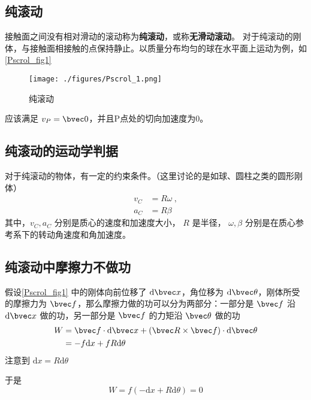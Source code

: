 

\subsection{纯滚动}
接触面之间没有相对滑动的滚动称为\textbf{纯滚动}，或称\textbf{无滑动滚动}。
对于纯滚动的刚体，与接触面相接触的点保持静止。以质量分布均匀的球在水平面上运动为例，如\autoref{Pscrol_fig1}
\begin{figure}[ht]
\centering
\texttt{[image: ./figures/Pscrol\_1.png]}
\caption{纯滚动} \label{Pscrol_fig1}
\end{figure}
应该满足 $v_P=\bvec 0$，并且P点处的切向加速度为0。

\subsection{纯滚动的运动学判据}
对于纯滚动的物体，有一定的约束条件。（这里讨论的是如球、圆柱之类的圆形刚体）
\begin{equation}
\begin{aligned}
v_C&=R\omega~,\\
a_C&=R\beta
\end{aligned}
\end{equation}
其中，$v_C,a_C$
分别是质心的速度和加速度大小，
$R$ 是半径，
$\omega,\beta$ 分别是在质心参考系下的转动角速度和角加速度。

\subsection{纯滚动中摩擦力不做功}
假设\autoref{Pscrol_fig1} 中的刚体向前位移了 $\mathrm{d}\bvec x$，角位移为 $\mathrm{d} \bvec \theta$，刚体所受的摩擦力为 $\bvec f$，那么摩擦力做的功可以分为两部分：一部分是 $\bvec f$ 沿 $\mathrm{d} \bvec x$ 做的功，另一部分是 $\bvec f$ 的力矩沿 $\bvec \theta$ 做的功
\begin{equation}
\begin{aligned}
W&=\bvec f\cdot\mathrm{d} \bvec x+(\bvec R\times \bvec f)\cdot\mathrm{d} \bvec \theta\\
&=-f\mathrm{d} x+fR\mathrm{d} \theta
\end{aligned}
\end{equation}
注意到 $\mathrm{d} x=R\mathrm{d} \theta$

于是\begin{equation}
W=f(-\mathrm{d} x+R\mathrm{d} \theta)=0
\end{equation}

